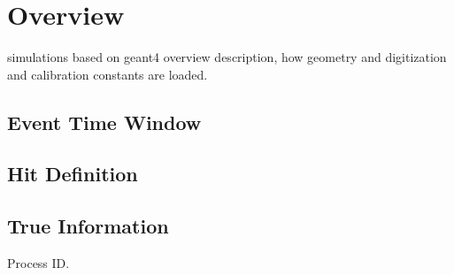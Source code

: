 \section{Overview}


simulations based on geant4 \cite{geant4} overview description, how geometry and digitization and calibration constants are loaded.

\subsection{Event Time Window}
\subsection{Hit Definition}
\subsection{True Information}
Process ID.








